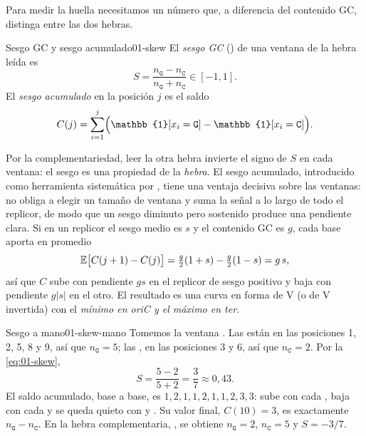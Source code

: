 Para medir la huella necesitamos un número que, a diferencia del contenido GC, distinga entre las dos hebras.

\begin{definicion}{Sesgo GC y sesgo acumulado}{01-skew}
El \emph{sesgo GC} () de una ventana de la hebra leída es
\begin{equation}\label{eq:01-skew}
S = \frac{n_\texttt{G}-n_\texttt{C}}{n_\texttt{G}+n_\texttt{C}} \in [-1, 1].
\end{equation}
El \emph{sesgo acumulado} en la posición $j$ es el saldo
\begin{equation}\label{eq:01-cumskew}
C(j) = \sum_{i=1}^{j}\Bigl(\mathbb{1}[x_i=\texttt{G}] - \mathbb{1}[x_i=\texttt{C}]\Bigr).
\end{equation}
\end{definicion}

\begin{simbolos}
\end{simbolos}

Por la complementariedad, leer la otra hebra invierte el signo de $S$ en cada ventana: el sesgo es una propiedad de la \emph{hebra}. El sesgo acumulado, introducido como herramienta sistemática por \textcite{c01-grigoriev1998}, tiene una ventaja decisiva sobre las ventanas: no obliga a elegir un tamaño de ventana y suma la señal a lo largo de todo el replicor, de modo que un sesgo diminuto pero sostenido produce una pendiente clara. Si en un replicor el sesgo medio es $s$ y el contenido GC es $g$, cada base aporta en promedio
\begin{equation}\label{eq:01-pendiente}
\mathbb{E}\bigl[C(j+1)-C(j)\bigr] = \tfrac{g}{2}(1+s) - \tfrac{g}{2}(1-s) = g\,s,
\end{equation}
así que $C$ sube con pendiente $gs$ en el replicor de sesgo positivo y baja con pendiente $g|s|$ en el otro. El resultado es una curva en forma de V (o de V invertida) con el \emph{mínimo en oriC y el máximo en ter}.

\begin{ejemplo}{Sesgo a mano}{01-skew-mano}
Tomemos la ventana . Las  están en las posiciones 1, 2, 5, 8 y 9, así que $n_\texttt{G}=5$; las , en las posiciones 3 y 6, así que $n_\texttt{C}=2$. Por la \cref{eq:01-skew},
\[
S = \frac{5-2}{5+2} = \frac{3}{7}\approx 0{,}43 .
\]
El saldo acumulado, base a base, es $1, 2, 1, 1, 2, 1, 1, 2, 3, 3$: sube con cada , baja con cada  y se queda quieto con  y . Su valor final, $C(10)=3$, es exactamente $n_\texttt{G}-n_\texttt{C}$. En la hebra complementaria, , se obtiene $n_\texttt{G}=2$, $n_\texttt{C}=5$ y $S=-3/7$.
\end{ejemplo}


